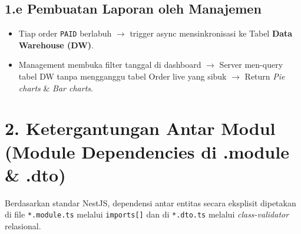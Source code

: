 \documentclass[11pt,a4paper]{article}
\begin{document}
\subsection{1.e Pembuatan Laporan oleh Manajemen}
\begin{itemize}
    \item Tiap order \texttt{PAID} berlabuh $\rightarrow$ trigger async mensinkronisasi ke Tabel \textbf{Data Warehouse (DW)}.
    \item Management membuka filter tanggal di dashboard $\rightarrow$ Server men-query tabel DW tanpa mengganggu tabel Order live yang sibuk $\rightarrow$ Return \textit{Pie charts} \& \textit{Bar charts}.
\end{itemize}

\clearpage
\section{2. Ketergantungan Antar Modul (Module Dependencies di .module \& .dto)}
Berdasarkan standar NestJS, dependensi antar entitas secara eksplisit dipetakan di file \texttt{*.module.ts} melalui \texttt{imports[]} dan di \texttt{*.dto.ts} melalui \textit{class-validator} relasional.
\end{document}
